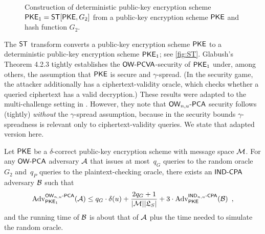 \begin{figure}[h]
\centering
{}
\caption{Construction of deterministic public-key encryption scheme $\textsf{\upshape\mdseries PKE}_1=\textsf{\upshape\mdseries ST}[\textsf{\upshape\mdseries PKE}, G_2]$ from a public-key encryption scheme $\textsf{\upshape\mdseries PKE}$ and hash function $G_2$.}
\label{fig:ST}
\end{figure}
The $\textsf{\upshape\mdseries ST}$ transform converts a public-key encryption scheme
$\textsf{\upshape\mdseries PKE}$ to a deterministic public-key encryption scheme $\textsf{\upshape\mdseries PKE}_1$; see
\autoref{fig:ST}. Glabush's Theorem 4.2.3 tightly establishes the
$\textsf{\upshape\mdseries OW-PCVA}$-security of $\textsf{\upshape\mdseries PKE}_1$ under, among others, the assumption
that $\textsf{\upshape\mdseries PKE}$ is \INDCPA secure and $\gamma$-spread. (In the \OWPCVA
security game, the attacker additionally has a ciphertext-validity
oracle, which checks whether a queried ciphertext has a valid
decryption.)  These results were adapted to the multi-challenge setting in \cite{GlabushThesis}. However, they note that $\textsf{\upshape\mdseries OW}_{n,u}\text{-}\textsf{\upshape\mdseries PCA}$ security follows
(tightly) \emph{without} the $\gamma$-spread assumption, because in
the security bounds $\gamma$-spreadness is relevant only to
ciphertext-validity queries.  We state that adapted version here.

\begin{lemma}
  \label{lem:ST}
  Let $\textsf{\upshape\mdseries PKE}$ be a $\delta$-correct public-key encryption scheme with
  message space $\mathcal{M}$. For any $\textsf{\upshape\mdseries OW-PCA}$ adversary $\mathcal{A}$ that
  issues at most~$q_G$ queries to the random oracle~$G_2$ and~$q_P$
  queries to the plaintext-checking oracle, there exists an $\textsf{\upshape\mdseries IND-CPA}$
  adversary $\mathcal{B}$ such that
  \[
  \mathrm{Adv}^{\textsf{\upshape\mdseries \ensuremath{\textsf{\upshape\mdseries OW}_{n,u}\text{-}\textsf{\upshape\mdseries PCA}}}}_{\textsf{\upshape\mdseries PKE}_1}(\mathcal{A}) \leq q_G \cdot \delta(u) + \frac{2 q_G
    + 1}{|\mathcal{M}||\mathfrak{L}_{S}|} + 3 \cdot \mathrm{Adv}^{\textsf{\upshape\mdseries \ensuremath{\textsf{\upshape\mdseries IND}_{n,u}\text{-}\textsf{\upshape\mdseries CPA}}}}_{\textsf{\upshape\mdseries PKE}}(\mathcal{B}) \enspace
  ,
  \]
  and the running time of $\mathcal{B}$ is about that of $\mathcal{A}$
  plus the time needed to simulate the random oracle.
\end{lemma}

